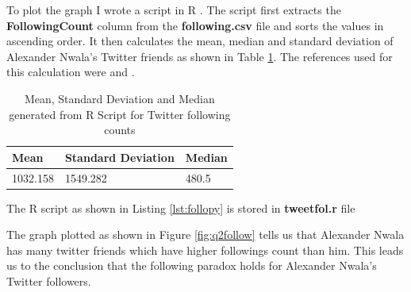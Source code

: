 \documentclass[letterpaper,11pt]{article}
\begin{document}


To plot the graph I wrote a script in R \cite{rdocref}. The script first extracts the  \textbf{FollowingCount} column from the\textbf{ following.csv} file and sorts the values in ascending order. It then calculates the mean, median and standard deviation of Alexander Nwala’s Twitter friends as shown in Table \ref{table:q5summary}. The references used for this calculation were \cite{sortref} and \cite{statref}. 


\begin{table}[htb]
\centering
\begin{tabular}{ | l | l | l |}
\hline
\textbf{Mean} & \textbf{Standard Deviation} & \textbf{Median} \\
\hline
1032.158 & 1549.282 & 480.5 \\
\hline
\end{tabular}
\caption{Mean, Standard Deviation and Median generated from R Script for Twitter following counts}
\label{table:q5summary}
\end{table}

The R script as shown in Listing \ref{lst:follopy}  is stored in \textbf{tweetfol.r} file 




The graph plotted as shown in Figure \ref{fig:q2follow} tells us that Alexander Nwala has many twitter friends which have higher followings count than him. This leads us to the conclusion that the following paradox holds for Alexander Nwala’s Twitter followers.
\end{document}
